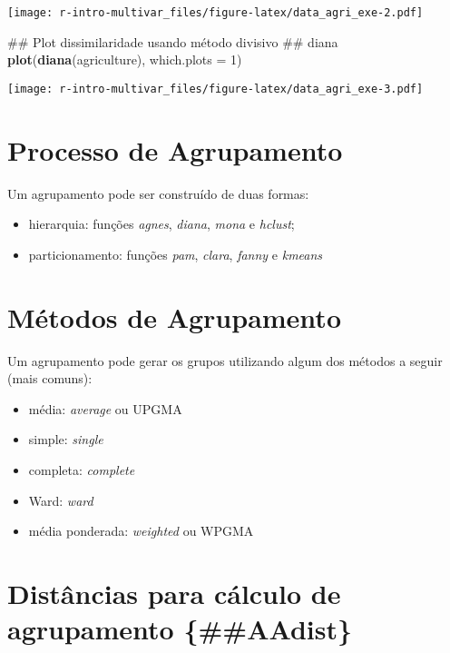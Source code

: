 \documentclass[]{book}
\newenvironment{Shaded}{\begin{snugshade}}{\end{snugshade}}
\newcommand{\KeywordTok}[1]{\textcolor[rgb]{0.13,0.29,0.53}{\textbf{{#1}}}}
\newcommand{\DataTypeTok}[1]{\textcolor[rgb]{0.13,0.29,0.53}{{#1}}}
\newcommand{\DecValTok}[1]{\textcolor[rgb]{0.00,0.00,0.81}{{#1}}}
\newcommand{\NormalTok}[1]{{#1}}
\providecommand{\tightlist}{%
  \setlength{\itemsep}{0pt}\setlength{\parskip}{0pt}}
\begin{document}
\texttt{[image: r-intro-multivar\_files/figure-latex/data\_agri\_exe-2.pdf]}

\begin{Shaded}
\begin{Highlighting}[]
\NormalTok{## Plot dissimilaridade usando método divisivo}
\NormalTok{## diana}
\KeywordTok{plot}\NormalTok{(}\KeywordTok{diana}\NormalTok{(agriculture), }\DataTypeTok{which.plots =} \DecValTok{1}\NormalTok{)}
\end{Highlighting}
\end{Shaded}

\texttt{[image: r-intro-multivar\_files/figure-latex/data\_agri\_exe-3.pdf]}

\section{Processo de Agrupamento}\label{AAprocess}

Um agrupamento pode ser construído de duas formas:

\begin{itemize}
\tightlist
\item
  hierarquia: funções \emph{agnes}, \emph{diana}, \emph{mona} e
  \emph{hclust};
\item
  particionamento: funções \emph{pam}, \emph{clara}, \emph{fanny} e
  \emph{kmeans}
\end{itemize}

\section{Métodos de Agrupamento}\label{AAmethod}

Um agrupamento pode gerar os grupos utilizando algum dos métodos a
seguir (mais comuns):

\begin{itemize}
\tightlist
\item
  média: \emph{average} ou UPGMA
\item
  simple: \emph{single}
\item
  completa: \emph{complete}
\item
  Ward: \emph{ward}
\item
  média ponderada: \emph{weighted} ou WPGMA
\end{itemize}

\section{Distâncias para cálculo de agrupamento
\{\#\#AAdist\}}\label{distancias-para-calculo-de-agrupamento-aadist}
\end{document}
